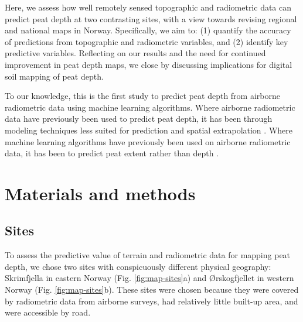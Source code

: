 \documentclass[soil, manuscript]{copernicus}
\begin{document}
Here, we assess how well remotely sensed topographic and radiometric data can predict peat depth at two contrasting sites, with a view towards revising regional and national maps in Norway.
Specifically, we aim to: (1) quantify the accuracy of predictions from topographic and radiometric variables, and (2) identify key predictive variables.
Reflecting on our results and the need for continued improvement in peat depth maps, we close by discussing implications for digital soil mapping of peat depth.

To our knowledge, this is the first study to predict peat depth from airborne radiometric data using machine learning algorithms.
Where airborne radiometric data have previously been used to predict peat depth, it has been through modeling techniques less suited for prediction and spatial extrapolation \citep[e.g.,][]{keaneySpatialStatisticsEstimate2013, gatisMappingUplandPeat2019, siemonAirborneElectromagneticRadiometric2020}.
Where machine learning algorithms have previously been used on airborne radiometric data, it has been to predict peat extent rather than depth \citep[e.g.,][]{olearyDigitalSoilMapping2022}.

\section{Materials and methods}

\subsection{Sites}

To assess the predictive value of terrain and radiometric data for mapping peat depth, we chose two sites with conspicuously different physical geography: Skrimfjella in eastern Norway (Fig. \ref{fig:map-sites}a) and Ørskogfjellet in western Norway (Fig. \ref{fig:map-sites}b).
These sites were chosen because they were covered by radiometric data from airborne surveys, had relatively little built-up area, and were accessible by road.
\end{document}
